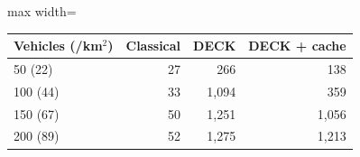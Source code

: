 \begin{adjustbox}{max width=\linewidth}
\begin{tabular}{lrrr}
\toprule
Vehicles (/km$^2$) & Classical & DECK & DECK + cache \\
\midrule
50 (22) & 27 & 266 & 138 \\
100 (44) & 33 & 1{,}094 & 359 \\
150 (67) & 50 & 1{,}251 & 1{,}056 \\
200 (89) & 52 & 1{,}275 & 1{,}213 \\
\bottomrule
\end{tabular}
\end{adjustbox}
\par{}
